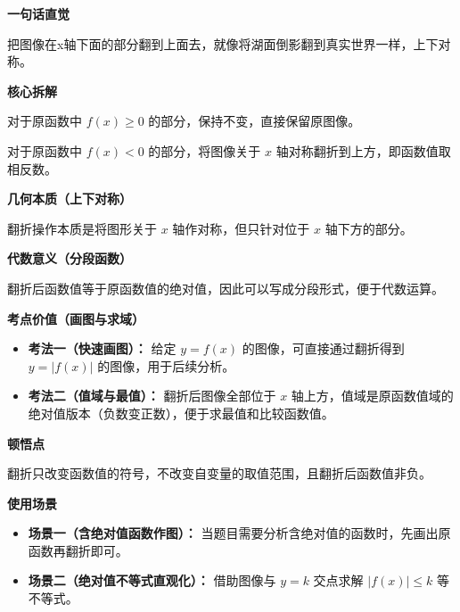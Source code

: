 \begin{explanationbox}
	\textbf{\textcolor{CExplanation}{一句话直觉}}

	把图像在x轴下面的部分翻到上面去，就像将湖面倒影翻到真实世界一样，上下对称。

	\medskip
	\textbf{\textcolor{CExplanation}{核心拆解}}
	\begin{description}[style=nextline, leftmargin=2.8em, labelsep=0.5em, itemsep=0.45em]
		\item[\textbf{要点一（轴上方保留）：}] 对于原函数中 $f(x)\ge0$ 的部分，保持不变，直接保留原图像。
		\item[\textbf{要点二（轴下方翻折）：}] 对于原函数中 $f(x)<0$ 的部分，将图像关于 $x$ 轴对称翻折到上方，即函数值取相反数。
	\end{description}

	\medskip
	\textbf{\textcolor{CExplanation}{几何本质（上下对称）}}

	翻折操作本质是将图形关于 $x$ 轴作对称，但只针对位于 $x$ 轴下方的部分。

	\medskip
	\textbf{\textcolor{CExplanation}{代数意义（分段函数）}}

	翻折后函数值等于原函数值的绝对值，因此可以写成分段形式，便于代数运算。

	\medskip
	\textbf{\textcolor{CExplanation}{考点价值（画图与求域）}}
	\begin{itemize}[leftmargin=*, itemsep=0.5em, topsep=0.4em]
		\item \textbf{考法一（快速画图）：} 给定 $y=f(x)$ 的图像，可直接通过翻折得到 $y=|f(x)|$ 的图像，用于后续分析。
		\item \textbf{考法二（值域与最值）：} 翻折后图像全部位于 $x$ 轴上方，值域是原函数值域的绝对值版本（负数变正数），便于求最值和比较函数值。
	\end{itemize}

	\medskip
	\textbf{\textcolor{CExplanation}{顿悟点}}

	翻折只改变函数值的符号，不改变自变量的取值范围，且翻折后函数值非负。

	\medskip
	\textbf{\textcolor{CExplanation}{使用场景}}
	\begin{itemize}[leftmargin=*, itemsep=0.5em, topsep=0.4em]
		\item \textbf{场景一（含绝对值函数作图）：} 当题目需要分析含绝对值的函数时，先画出原函数再翻折即可。
		\item \textbf{场景二（绝对值不等式直观化）：} 借助图像与 $y=k$ 交点求解 $|f(x)|\le k$ 等不等式。
	\end{itemize}
\end{explanationbox}
